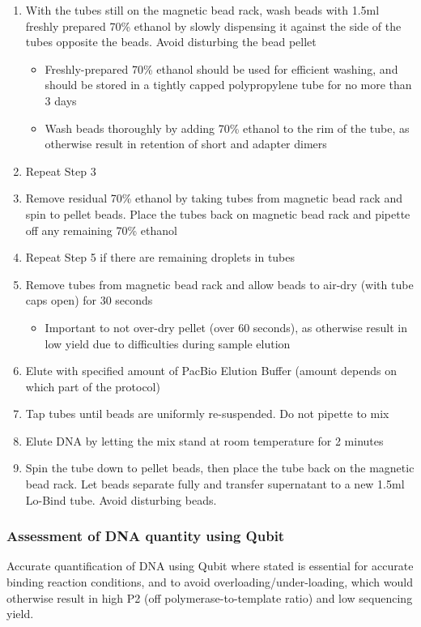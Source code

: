 \begin{enumerate}
\begin{itemize}
	\end{itemize}
	\item With the tubes still on the magnetic bead rack, wash beads with 1.5ml freshly prepared 70\% ethanol by slowly dispensing it against the side of the tubes opposite the beads. Avoid disturbing the bead pellet
	\begin{itemize}
		\item Freshly-prepared 70\% ethanol should be used for efficient washing, and should be stored in a tightly capped polypropylene tube for no more than 3 days
		\item Wash beads thoroughly by adding 70\% ethanol to the rim of the tube, as otherwise result in retention of short and adapter dimers
	\end{itemize} 	
	\item Repeat Step 3 
	\item Remove residual 70\% ethanol by taking tubes from magnetic bead rack and spin to pellet beads. Place the tubes back on magnetic bead rack and pipette off any remaining 70\% ethanol
	\item Repeat Step 5 if there are remaining droplets in tubes 
	\item Remove tubes from magnetic bead rack and allow beads to air-dry (with tube caps open) for 30 seconds
	\begin{itemize}
		\item Important to not over-dry pellet (over 60 seconds), as otherwise result in low yield due to difficulties during sample elution 
	\end{itemize}
	\item Elute with specified amount of PacBio Elution Buffer (amount depends on which part of the protocol)
	\item Tap tubes until beads are uniformly re-suspended. Do not pipette to mix
	\item Elute DNA by letting the mix stand at room temperature for 2 minutes
	\item Spin the tube down to pellet beads, then place the tube back on the magnetic bead rack. Let beads separate fully and transfer supernatant to a new 1.5ml Lo-Bind tube. Avoid disturbing beads. 
\end{enumerate}


\subsubsection{Assessment of DNA quantity using Qubit}
Accurate quantification of DNA using Qubit where stated is essential for accurate binding reaction conditions, and to avoid overloading/under-loading, which would otherwise result in high P2 (off polymerase-to-template ratio) and low sequencing yield. 

